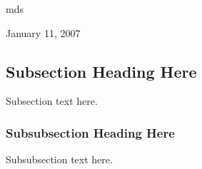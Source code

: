 \documentclass[journal]{IEEEtran}
\begin{document}
\hfill mds
 
\hfill January 11, 2007

\subsection{Subsection Heading Here}
Subsection text here.


\subsubsection{Subsubsection Heading Here}
Subsubsection text here.


%
%



%
%
\end{document}
